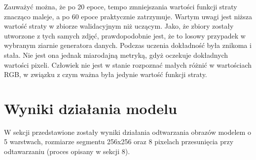 \documentclass[a4paper,11pt]{article}
\begin{document}
Zauważyć można, że po 20 epoce, tempo zmniejszania wartości funkcji straty znacząco maleje,
a po 60 epoce praktycznie zatrzymuje.
Wartym uwagi jest niższa wartość straty w zbiorze walidacyjnym niż uczącym. Jako, że zbiory zostały utworzone z tych samych zdjęć,
prawdopodobnie jest, że to losowy przypadek w wybranym ziarnie generatora danych.
Podczas uczenia dokładność była znikoma i stała. Nie jest ona jednak miarodajną metryką, gdyż oczekuje dokładnych wartości pixeli.
Człowiek nie jest w stanie rozpoznać małych różnić w wartościach RGB, w związku z czym ważna była jedynie wartość funkcji straty.

\section{Wyniki działania modelu}
W sekcji przedstawione zostały wyniki działania odtwarzania obrazów modelem o 5 warstwach,
rozmiarze segmentu 256x256 oraz 8 pixelach przesunięcia przy odtawarzaniu (proces opisany w sekcji 8).
\newpage
\end{document}
